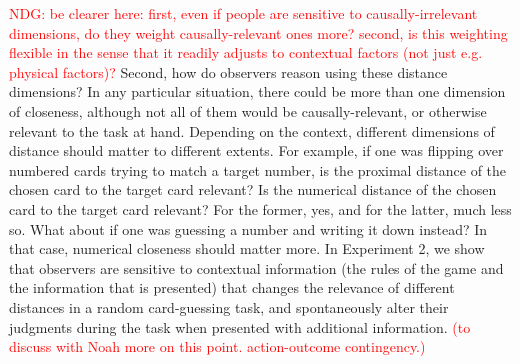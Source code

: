 \documentclass[10pt,letterpaper]{article}
\newcommand{\red}[1]{\textcolor{Red}{#1}}
\begin{document}




\red{NDG: be clearer here: first, even if people are sensitive to causally-irrelevant dimensions, do they weight causally-relevant ones more? second, is this weighting flexible in the sense that it readily adjusts to contextual factors (not just e.g. physical factors)?}
Second, how do observers reason using these distance dimensions? In any particular situation, there could be more than one dimension of closeness, although not all of them would be causally-relevant, or otherwise relevant to the task at hand. Depending on the context, different dimensions of distance should matter to different extents. For example, if one was flipping over numbered cards trying to match a target number, is the proximal distance of the chosen card to the target card relevant? Is the numerical distance of the chosen card to the target card relevant? For the former, yes, and for the latter, much less so. What about if one was guessing a number and writing it down instead? In that case, numerical closeness should matter more. In Experiment 2, we show that observers are sensitive to contextual information (the rules of the game and the information that is presented) that changes the relevance of different distances in a random card-guessing task, and spontaneously alter their judgments during the task when presented with additional information.
\textcolor{red}{(to discuss with Noah more on this point. action-outcome contingency.)} %
\end{document}
